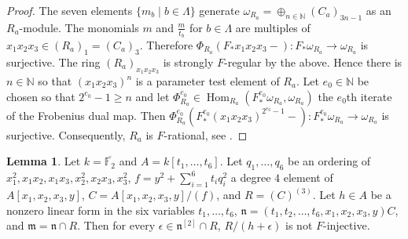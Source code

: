 \documentclass[reqno,11pt]{amsart}
\numberwithin{equation}{section}
\theoremstyle{definition}
\theoremstyle{definition}
\newtheorem{lemma}[theorem]{Lemma}
\theoremstyle{definition}
\theoremstyle{remark}
\newcommand{\Hom}{\operatorname{Hom}}
\newcommand{\NN}{\mathbb{N}}
\newcommand{\fm}{\mathfrak{m}}
\newcommand{\fn}{\mathfrak{n}}
\begin{document}
\begin{proof}
    The seven elements $\{m_b\mid b\in \Lambda\}$ generate $\omega_{R_a} = \oplus_{n\in\NN} (C_a)_{3n-1}$ as an $R_a$-module. The monomials $m$ and $\frac{m}{t_b}$ for $b\in \Lambda$ are multiples of $x_1x_2x_3\in (R_a)_1 = (C_a)_3$. Therefore $\Phi_{R_a}(F_*x_1x_2x_3-):F_*\omega_{R_a}\to \omega_{R_a}$ is surjective. The ring $(R_a)_{x_1x_2x_3}$ is strongly $F$-regular by the above. Hence there is $n\in\NN$ so that $(x_1x_2x_3)^n$ is a parameter test element of $R_a$. Let $e_0\in\NN$ be chosen so that $2^{e_0}-1\geq n$ and let $\Phi_{R_a}^{e_0}\in\Hom_{R_a}(F^{e_0}_*\omega_{R_a},\omega_{R_a})$ the $e_0$th iterate of the Frobenius dual map. Then $\Phi^{e_0}_{R_a}(F^{e_0}_*(x_1x_2x_3)^{2^{e_0}-1}-):F^{e_0}_*\omega_{R_a}\to \omega_{R_a}$ is surjective. Consequently, $R_a$ is $F$-rational, see \cite[Proposition~2.3]{DSPS25}.
\end{proof}



\begin{lemma}
    \label{lemma: Not F-injective lemma}
    Let $k=\overline{\mathbb F_2}$ and $A=k[t_1,\ldots,t_6]$. Let $q_1,\ldots,q_6$ be an ordering of $x_1^2, x_1x_2, x_1x_3, x_2^2, x_2x_3, x_3^2$, $ f=y^2+\sum_{i=1}^6t_iq_i^2$ a degree $4$ element of $A[x_1,x_2,x_3,y]$, $C = A[x_1,x_2,x_3,y]/(f)$, and $R=(C)^{(3)}$. Let $h\in A$ be a nonzero linear form in the six variables $t_1,\ldots,t_6$, $\fn = (t_1,t_2,\ldots,t_6,x_1,x_2,x_3,y)C$, and $\fm = \fn\cap R$. Then for every $\epsilon\in \fn^{[2]}\cap R$, $R/(h+\epsilon)$ is not $F$-injective.
\end{lemma}
\end{document}
